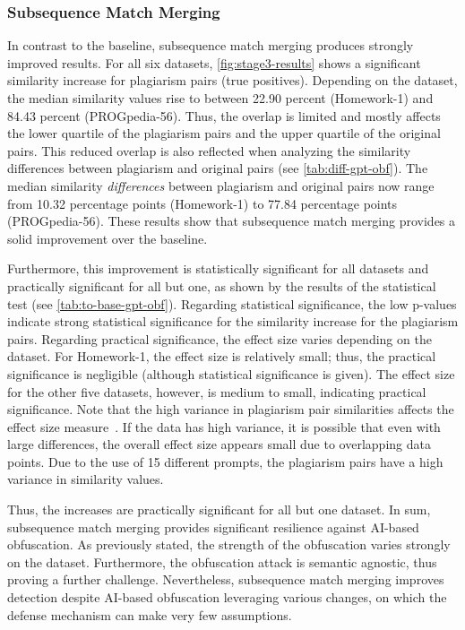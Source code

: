 \subsubsection{Subsequence Match Merging}
In contrast to the baseline, subsequence match merging produces strongly improved results.
For all six datasets, \autoref{fig:stage3-results} shows a significant similarity increase for plagiarism pairs (true positives).
Depending on the dataset, the median similarity values rise to between 22.90 percent (Homework-1) and 84.43 percent (PROGpedia-56).
Thus, the overlap is limited and mostly affects the lower quartile of the plagiarism pairs and the upper quartile of the original pairs.
This reduced overlap is also reflected when analyzing the similarity differences between plagiarism and original pairs (see \autoref{tab:diff-gpt-obf}).
The median similarity \textit{differences} between plagiarism and original pairs now range from 10.32 percentage points (Homework-1) to 77.84 percentage points (PROGpedia-56).
These results show that subsequence match merging provides a solid improvement over the baseline. 

Furthermore, this improvement is statistically significant for all datasets and practically significant for all but one, as shown by the results of the statistical test (see \autoref{tab:to-base-gpt-obf}).
Regarding statistical significance, the low p-values indicate strong statistical significance for the similarity increase for the plagiarism pairs.
Regarding practical significance, the effect size varies depending on the dataset. For Homework-1, the effect size is relatively small; thus, the practical significance is negligible (although statistical significance is given).
The effect size for the other five datasets, however, is medium to small, indicating practical significance.
Note that the high variance in plagiarism pair similarities affects the effect size measure~\cite{Grissom2012}. If the data has high variance, it is possible that even with large differences, the overall effect size appears small due to overlapping data points. Due to the use of 15 different prompts, the plagiarism pairs have a high variance in similarity values.

Thus, the increases are practically significant for all but one dataset.
In sum, subsequence match merging provides significant resilience against AI-based obfuscation. As previously stated, the strength of the obfuscation varies strongly on the dataset. Furthermore, the obfuscation attack is semantic agnostic, thus proving a further challenge.
Nevertheless, subsequence match merging improves detection despite AI-based obfuscation leveraging various changes, on which the defense mechanism can make very few assumptions.

